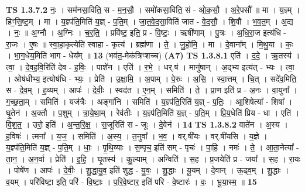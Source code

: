 \documentclass[17pt]{extarticle}
\begin{document}
                  \newline
                                \textbf{ TS 1.3.7.2} \newline
                  नः॒ । सम॑नसा॒विति॒ स - म॒न॒सौ॒ । समो॑कसा॒विति॒ सं - ओ॒क॒सौ॒ । अ॒रे॒पसौ᳚ ॥ मा । य॒ज्ञ्म् । हिꣳ॒॒सि॒ष्ट॒म् । मा । य॒ज्ञ्प॑ति॒मिति॑ य॒ज्ञ् - प॒ति॒म् । जा॒त॒वे॒द॒सा॒विति॑ जात - वे॒द॒सौ॒ । शि॒वौ । भ॒व॒त॒म् । अ॒द्य । नः॒ ॥ अ॒ग्नौ । अ॒ग्निः । च॒र॒ति॒ । प्रवि॑ष्ट॒ इति॒ प्र - वि॒ष्टः॒ । ऋषी॑णाम् । पु॒त्रः । अ॒धि॒रा॒ज इत्य॑धि - रा॒जः । ए॒षः ॥ स्वा॒हा॒कृत्येति॑ स्वाहा - कृत्य॑ । ब्रह्म॑णा । ते॒ । जु॒हो॒मि॒ । मा । दे॒वाना᳚म् । मि॒थु॒या । कः॒ । भा॒ग॒धेय॒मिति॑ भाग - धेय᳚म् ॥ \textbf{  13 } \newline
                  \newline
                      (भव॑त॒-मेक॑त्रिꣳशच्च)  \textbf{(A7)} \newline \newline
                                \textbf{ TS 1.3.8.1} \newline
                  एति॑ । द॒दे॒ । ऋ॒तस्य॑ । त्वा॒ । दे॒व॒ह॒वि॒रिति॑ देव - ह॒विः॒ । पाशे॑न । एति॑ । र॒भे॒ । धर्.ष॑ । मानु॑षान् । अ॒द्भ्य इत्य॑त् - भ्यः । त्वा॒ । ओष॑धीभ्य॒ इत्योष॑धि - भ्यः॒ । प्रेति॑ । उ॒क्षा॒मि॒ । अ॒पाम् । पे॒रुः । अ॒सि॒ । स्वा॒त्तम् । चि॒त् । सदे॑व॒मिति॒ स - दे॒व॒म् । ह॒व्यम् । आपः॑ । दे॒वीः॒ । स्वद॑त । ए॒न॒म् । समिति॑ । ते॒ । प्रा॒ण इति॑ प्र - अ॒नः । वा॒युना᳚ । ग॒च्छ॒ता॒म् । समिति॑ । यज॑त्रैः । अङ्गा॑नि । समिति॑ । य॒ज्ञ्प॑ति॒रिति॑ य॒ज्ञ् - प॒तिः॒ । आ॒शिषेत्या᳚ - शिषा᳚ । घृ॒तेन॑ । अ॒क्तौ । प॒शुम् । त्रा॒ये॒था॒म् । रेव॑तीः । य॒ज्ञ्प॑ति॒मिति॑ य॒ज्ञ् - प॒ति॒म् । प्रि॒य॒धेति॑ प्रिय - धा । एति॑ । वि॒श॒त॒ । उरो॒ इति॑ । अ॒न्त॒रि॒क्ष॒ । स॒जूरिति॑ स - जूः । दे॒वेन॑ । \textbf{  14} \newline
                  \newline
                                \textbf{ TS 1.3.8.2} \newline
                  वाते॑न । अ॒स्य । ह॒विषः॑ । त्मना᳚ । य॒ज॒ । समिति॑ । अ॒स्य॒ । त॒नुवा᳚ । भ॒व॒ । वर्.षी॑यः । वर्.षी॑यसि । य॒ज्ञे । य॒ज्ञ्प॑ति॒मिति॑ य॒ज्ञ् - प॒ति॒म् । धाः॒ । पृ॒थि॒व्याः । स॒म्पृच॒ इति॑ सम् - पृचः॑ । पा॒हि॒ । नमः॑ । ते॒ । आ॒ता॒नेत्या᳚ - ता॒न॒ । अ॒न॒र्वा । प्रेति॑ । इ॒हि॒ । घृ॒तस्य॑ । कु॒॒ल्याम् । अन्विति॑ । स॒ह । प्र॒जयेति॑ प्र - जया᳚ । स॒ह । रा॒यः । पोषे॑ण । आपः॑ । दे॒वीः॒ । शु॒द्धा॒यु॒व॒ इति॑ शुद्ध - यु॒वः॒ । शु॒द्धाः । यू॒यम् । दे॒वान् । ऊ॒ढ्व॒म् । शु॒द्धाः । व॒यम् । परि॑विष्टा॒ इति॒ परि॑ - वि॒ष्टाः॒ । प॒रि॒वे॒ष्टार॒ इति॑ परि - वे॒ष्टारः॑ । वः॒ । भू॒या॒स्म॒ ॥ \textbf{  15} \newline
\end{document}
